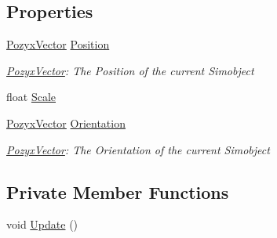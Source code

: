 \subsection*{Properties}
\begin{DoxyCompactItemize}
\item 
\hyperlink{struct_pozyx_positioner_1_1_framework_1_1_pozyx_vector}{Pozyx\+Vector} \hyperlink{class_pozyx_positioner_1_1_framework_1_1_sim_object_a1d2b2ac8c37883939483d4682826db21}{Position}
\begin{DoxyCompactList}\small\item\em \hyperlink{struct_pozyx_positioner_1_1_framework_1_1_pozyx_vector}{Pozyx\+Vector}\+: The Position of the current Simobject \end{DoxyCompactList}\item 
float \hyperlink{class_pozyx_positioner_1_1_framework_1_1_sim_object_ab9f89c4e327e25286f0269960d0d2de8}{Scale}
\item 
\hyperlink{struct_pozyx_positioner_1_1_framework_1_1_pozyx_vector}{Pozyx\+Vector} \hyperlink{class_pozyx_positioner_1_1_framework_1_1_sim_object_af589d7d7066efe823f8a2decd5b081da}{Orientation}
\begin{DoxyCompactList}\small\item\em \hyperlink{struct_pozyx_positioner_1_1_framework_1_1_pozyx_vector}{Pozyx\+Vector}\+: The Orientation of the current Simobject \end{DoxyCompactList}\end{DoxyCompactItemize}
\subsection*{Private Member Functions}
\begin{DoxyCompactItemize}
\item 
void \hyperlink{class_pozyx_positioner_1_1_framework_1_1_sim_object_afe392c2a31003ef615127a8c00f6ed27}{Update} ()
\end{DoxyCompactItemize}
